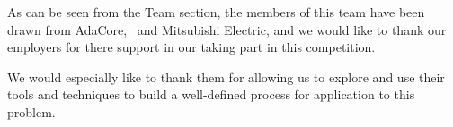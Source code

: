 \label{Acknowledgments}
As can be seen from the Team section, the members of this team have
been drawn from AdaCore, \altran\ and Mitsubishi Electric, and we would like to
thank our employers for there support in our taking part in this
competition.

We would especially like to thank them for allowing us to explore and
use their tools and techniques to build a well-defined process for
application to this problem.

